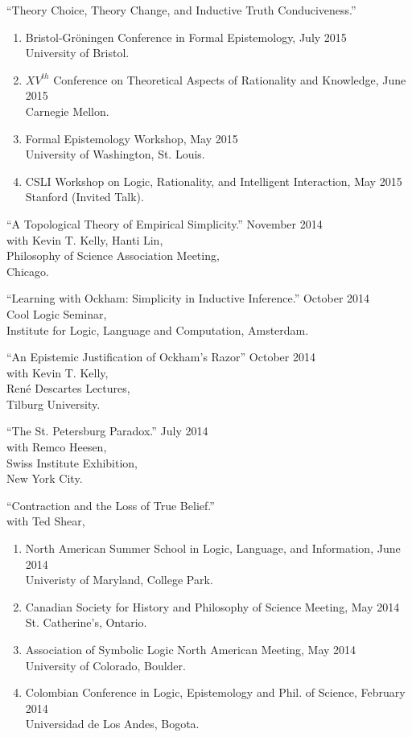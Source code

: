 \documentclass[12pt]{res} %
\begin{document}
\begin{resume}
``Theory Choice, Theory Change, and Inductive Truth Conduciveness.''\\
\begin{enumerate}
\item Bristol-Gr\"{o}ningen Conference in Formal Epistemology, \hfill July 2015 \\University of Bristol. 
\item $XV^{th}$ Conference on Theoretical Aspects of Rationality and Knowledge, \hfill June 2015\\ Carnegie Mellon. 
\item Formal Epistemology Workshop, \hfill May 2015\\ University of Washington, St. Louis. 
\item CSLI Workshop on Logic, Rationality, and Intelligent Interaction, \hfill May 2015\\ Stanford (Invited Talk). 
\end{enumerate}

``A Topological Theory of Empirical Simplicity.'' \hfill November 2014\\
with Kevin T. Kelly, Hanti Lin,\\
Philosophy of Science Association Meeting,\\
Chicago.

``Learning with Ockham: Simplicity in Inductive Inference.'' \hfill October 2014\\
Cool Logic Seminar,\\ 
Institute for Logic, Language and Computation, Amsterdam.

``An Epistemic Justification of Ockham's Razor'' \hfill October 2014\\ with Kevin T. Kelly,\\ Ren\'{e} Descartes Lectures,\\
Tilburg University.

``The St. Petersburg Paradox.'' \hfill July 2014\\
with Remco Heesen,\\
Swiss Institute Exhibition,\\ 
New York City. 


``Contraction and the Loss of True Belief.'' \\
with Ted Shear,\\
\begin{enumerate}
\item North American Summer School in Logic, Language, and Information, \hfill June 2014\\ Univeristy of Maryland, College Park. 
\item Canadian Society for History and Philosophy of Science Meeting, \hfill May 2014\\ St. Catherine's, Ontario. 
\item Association of Symbolic Logic North American Meeting, \hfill May 2014\\ University of Colorado, Boulder. 
\item Colombian Conference in Logic, Epistemology and Phil. of Science, \hfill February 2014\\ Universidad de Los Andes, Bogota. 
\end{enumerate}


\end{resume}
\end{document}
